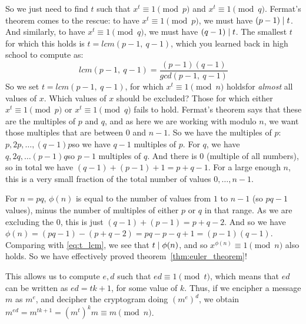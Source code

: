   So we just need to find $t$ such that $x^t \equiv 1 \pmod{p}$ and $x^t \equiv 1 \pmod{q}$. Fermat's theorem comes to the rescue: to have $x^t \equiv 1 \pmod{p}$, we must have $(p-1)\mathrel{|} t$. And similarly, to have $x^t \equiv 1 \pmod{q}$, we must have $(q-1)\mathrel{|} t$. The smallest $t$ for which this holds is $t = lcm(p-1,\ q-1)$, which you learned back in high school to compute as:
  \begin{equation}
    \label{eq:t_lcm}
    lcm(p-1,\ q-1) = \frac{(p-1)(q-1)}{gcd(p-1,\ q-1)}
  \end{equation}
  So we set $t = lcm(p-1,\ q-1)$, for which $x^t\equiv 1 \pmod{n}$ holds\emd for \emph{almost} all values of $x$. Which values of $x$ should be excluded? Those for which either $x^t \equiv 1 \pmod{p}$ or $x^t \equiv 1 \pmod{q}$ fails to hold. Fermat's theorem says that these are the multiples of $p$ and $q$, and as here we are working with modulo $n$, we want those multiples that are between $0$ and $n-1$. So we have the multiples of $p$: $p, 2p, \dots, (q-1)p$\emd so we have $q-1$ multiples of $p$. For $q$, we have $q, 2q, \dots (p-1)q$\emd so $p-1$ multiples of $q$. And there is $0$ (multiple of all numbers), so in total we have $(q-1) + (p-1) + 1 = p+q-1$. For a large enough $n$, this is a very small fraction of the total number of values $0, \dots, n-1$.
  \begin{remark}
    \label{rem:n_pq_totient}
    For $n=pq$, $\phi(n)$ is equal to the number of values from $1$ to $n-1$ (so $pq-1$ values), minus the number of multiples of either $p$ or $q$ in that range. As we are excluding the $0$, this is just $(q-1) + (p-1) = p +q - 2$. And so we have $\phi(n) = (pq - 1) - (p + q -2) = pq - p - q + 1 = (p-1)(q - 1)$. Comparing with \eqref{eq:t_lcm}, we see that $t\mathrel{|} \phi(n)$, and so $x^{\phi(n)} \equiv 1\pmod{n}$ also holds. So we have effectively proved theorem~\ref{thm:euler_theorem}!
  \end{remark}

  \medskip

   This allows us to compute $e, d$ such that $ed \equiv 1 \pmod{t}$, which means that $ed$ can be written as $ed = tk + 1$, for some value of $k$. Thus, if we encipher a message $m$ as $m^e$, and decipher the cryptogram doing $(m^{e})^d$, we obtain $m^{ed} = m^{tk +1} = (m^t)^k m \equiv m\pmod{n}$.

